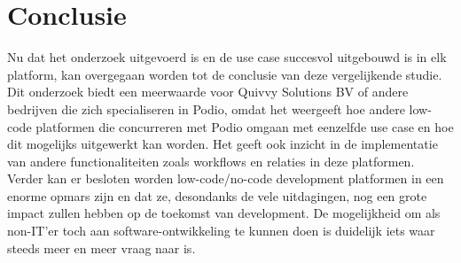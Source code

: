 
\chapter{Conclusie}%
\label{ch:conclusie}


Nu dat het onderzoek uitgevoerd is en de use case succesvol uitgebouwd is in elk platform, kan overgegaan worden tot de conclusie van deze vergelijkende studie. \\

Dit onderzoek biedt een meerwaarde voor Quivvy Solutions BV of andere bedrijven die zich specialiseren in Podio, omdat het weergeeft hoe andere low-code platformen die concurreren met Podio omgaan met eenzelfde use case en hoe dit mogelijks uitgewerkt kan worden. Het geeft ook inzicht in de implementatie van andere functionaliteiten zoals workflows en relaties in deze platformen. \\

Verder kan er besloten worden low-code/no-code development platformen in een enorme opmars zijn en dat ze, desondanks de vele uitdagingen, nog een grote impact zullen hebben op de toekomst van development. De mogelijkheid om als non-IT'er toch aan software-ontwikkeling te kunnen doen is duidelijk iets waar steeds meer en meer vraag naar is. \\

